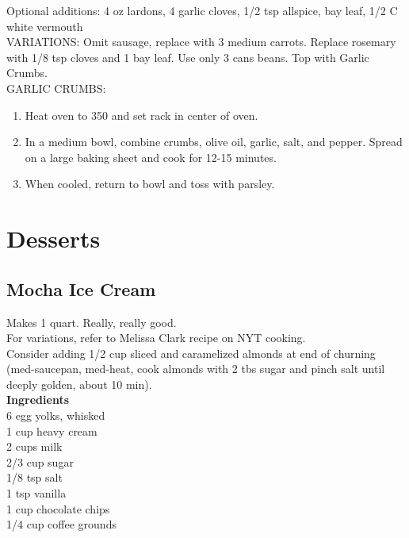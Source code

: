 \documentclass{article}
\numberwithin{figure}{section}
\numberwithin{equation}{section}
\begin{document}
Optional additions:  4 oz lardons, 4 garlic cloves, 1/2 tsp allspice, bay leaf, 1/2 C white vermouth\\

VARIATIONS:  Omit sausage, replace with 3 medium carrots.  Replace rosemary with 1/8 tsp cloves and 1 bay leaf.  Use only 3 cans beans.  Top with Garlic Crumbs.\\

GARLIC CRUMBS:
\begin{enumerate}
\item Heat oven to 350 and set rack in center of oven.
\item In a medium bowl, combine crumbs, olive oil, garlic, salt, and pepper.  Spread on a large baking sheet and cook for 12-15 minutes.
\item When cooled, return to bowl and toss with parsley.
\end{enumerate}

\pagebreak
\section{Desserts}


\pagebreak
\subsection{Mocha Ice Cream}
Makes 1 quart. Really, really good.\\
For variations, refer to Melissa Clark recipe on NYT cooking.\\
Consider adding 1/2 cup sliced and caramelized almonds at end of churning (med-saucepan, med-heat, cook almonds with 2 tbs sugar and pinch salt until deeply golden, about 10 min).\\

{\bf Ingredients}\\
6 egg yolks, whisked \\
1 cup heavy cream\\
2 cups milk\\
2/3 cup sugar\\
1/8 tsp salt\\
1 tsp vanilla\\
1 cup chocolate chips\\
1/4 cup coffee grounds\\
\end{document}
